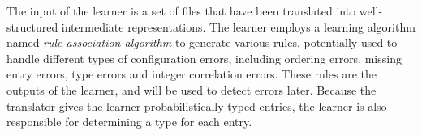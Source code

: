 The input of the learner is a set of files that have been translated
into well-structured intermediate representations. 
The learner employs a learning algorithm named {\em rule association 
algorithm} to generate various rules,
potentially used to handle different types of configuration errors,
including ordering errors, missing entry errors,
type errors and integer correlation errors.
These rules are the outputs of the learner, 
and will be used to detect errors later.
Because the translator gives the learner probabilistically typed entries,
the learner is also responsible for determining a type for each entry.


